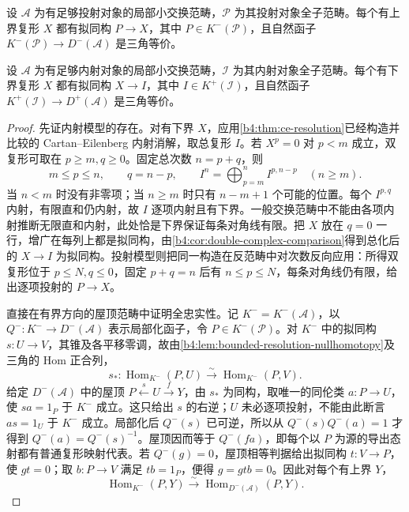 \begin{theorem}\label{b4:thm:bounded-projective-model}
	设 \(\mathcal A\) 为有足够投射对象的局部小交换范畴，\(\mathcal P\) 为其投射对象全子范畴。每个有上界复形 \(X\) 都有拟同构 \(P\to X\)，其中 \(P\in K^-(\mathcal P)\)，且自然函子 \(K^-(\mathcal P)\to D^-(\mathcal A)\) 是三角等价。
\end{theorem}
\begin{theorem}\label{b4:thm:bounded-injective-model}
	设 \(\mathcal A\) 为有足够内射对象的局部小交换范畴，\(\mathcal I\) 为其内射对象全子范畴。每个有下界复形 \(X\) 都有拟同构 \(X\to I\)，其中 \(I\in K^+(\mathcal I)\)，且自然函子 \(K^+(\mathcal I)\to D^+(\mathcal A)\) 是三角等价。
\end{theorem}
\begin{proof}
	先证内射模型的存在。对有下界 \(X\)，应用\cref{b4:thm:ce-resolution}已经构造并比较的 Cartan--Eilenberg 内射消解，取总复形 \(I\)。若 \(X^p=0\) 对 \(p<m\) 成立，双复形可取在 \(p\ge m,q\ge0\)。固定总次数 \(n=p+q\)，则
	\[
		m\le p\le n,\qquad q=n-p,\qquad I^n=\bigoplus_{p=m}^{n}I^{p,n-p}\quad(n\ge m).
	\]
	当 \(n<m\) 时没有非零项；当 \(n\ge m\) 时只有 \(n-m+1\) 个可能的位置。每个 \(I^{p,q}\) 内射，有限直和仍内射，故 \(I\) 逐项内射且有下界。一般交换范畴中不能由各项内射推断无限直和内射，此处恰是下界保证每条对角线有限。把 \(X\) 放在 \(q=0\) 一行，增广在每列上都是拟同构，由\cref{b4:cor:double-complex-comparison}得到总化后的 \(X\to I\) 为拟同构。投射模型则把同一构造在反范畴中对次数反向应用：所得双复形位于 \(p\le N,q\le0\)，固定 \(p+q=n\) 后有 \(n\le p\le N\)，每条对角线仍有限，给出逐项投射的 \(P\to X\)。

	直接在有界方向的屋顶范畴中证明全忠实性。记 \(K^-=K^-(\mathcal A)\)，以 \(Q^-:K^-\to D^-(\mathcal A)\) 表示局部化函子，令 \(P\in K^-(\mathcal P)\)。对 \(K^-\) 中的拟同构 \(s:U\to V\)，其锥及各平移零调，故由\cref{b4:lem:bounded-resolution-nullhomotopy}及三角的 Hom 正合列，
	\[
		s_*:\operatorname{Hom}_{K^-}(P,U) \xrightarrow{\sim}\operatorname{Hom}_{K^-}(P,V).
	\]
	给定 \(D^-(\mathcal A)\) 中的屋顶 \(P\xleftarrow{s}U\xrightarrow{f}Y\)，由 \(s_*\) 为同构，取唯一的同伦类 \(a:P\to U\)，使 \(sa=1_P\) 于 \(K^-\) 成立。这只给出 \(s\) 的右逆；\(U\) 未必逐项投射，不能由此断言 \(as=1_U\) 于 \(K^-\) 成立。局部化后 \(Q^-(s)\) 已可逆，所以从 \(Q^-(s)Q^-(a)=1\) 才得到 \(Q^-(a)=Q^-(s)^{-1}\)。屋顶因而等于 \(Q^-(fa)\)，即每个以 \(P\) 为源的导出态射都有普通复形映射代表。若 \(Q^-(g)=0\)，屋顶相等判据给出拟同构 \(t:V\to P\)，使 \(gt=0\)；取 \(b:P\to V\) 满足 \(tb=1_P\)，便得 \(g=gtb=0\)。因此对每个有上界 \(Y\)，
	\[
		\operatorname{Hom}_{K^-}(P,Y) \xrightarrow{\sim}\operatorname{Hom}_{D^-(\mathcal A)}(P,Y).
	\]


\end{proof}

